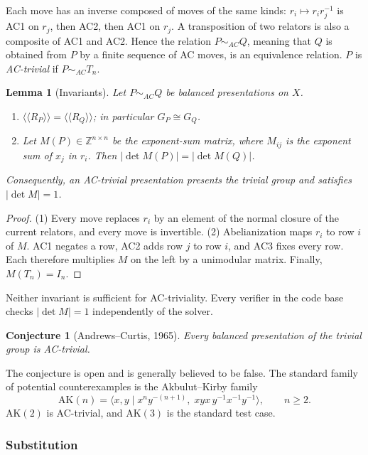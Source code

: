 \documentclass[11pt]{article}
\newtheorem{lemma}[theorem]{Lemma}
\newtheorem{conjecture}[theorem]{Conjecture}
\theoremstyle{definition}
\theoremstyle{remark}
\newcommand{\nc}[1]{\langle\!\langle #1 \rangle\!\rangle}
\newcommand{\pres}[2]{\langle #1 \mid #2 \rangle}
\begin{document}
Each move has an inverse composed of moves of the same kinds: $r_i\mapsto r_ir_j^{-1}$ is AC1 on $r_j$, then AC2,
then AC1 on $r_j$. A transposition of two relators is also a composite of AC1 and AC2. Hence the relation
$P\sim_{AC}Q$, meaning that $Q$ is obtained from $P$ by a finite sequence of AC moves, is an equivalence relation.
$P$ is \emph{AC-trivial} if $P\sim_{AC}T_n$.

\begin{lemma}[Invariants]\label{lem:inv}
Let $P\sim_{AC}Q$ be balanced presentations on $X$.
\begin{enumerate}
  \item $\nc{R_P}=\nc{R_Q}$; in particular $G_P\cong G_Q$.
  \item Let $M(P)\in\mathbb{Z}^{n\times n}$ be the exponent-sum matrix, where $M_{ij}$ is the exponent sum of $x_j$ in
  $r_i$. Then $|\det M(P)|=|\det M(Q)|$.
\end{enumerate}
Consequently, an AC-trivial presentation presents the trivial group and satisfies $|\det M|=1$.
\end{lemma}

\begin{proof}
(1) Every move replaces $r_i$ by an element of the normal closure of the current relators, and every move is
invertible. (2) Abelianization maps $r_i$ to row $i$ of $M$. AC1 negates a row, AC2 adds row $j$ to row $i$, and AC3
fixes every row. Each therefore multiplies $M$ on the left by a unimodular matrix. Finally, $M(T_n)=I_n$.
\end{proof}

Neither invariant is sufficient for AC-triviality. Every verifier in the code base checks $|\det M|=1$ independently of
the solver.

\begin{conjecture}[Andrews--Curtis, 1965]
Every balanced presentation of the trivial group is AC-trivial.
\end{conjecture}

The conjecture is open and is generally believed to be false. The standard family of potential counterexamples is
the Akbulut--Kirby family
\[
\mathrm{AK}(n)=\pres{x,y}{x^{n}y^{-(n+1)},\;xyx\,y^{-1}x^{-1}y^{-1}},\qquad n\ge2.
\]
$\mathrm{AK}(2)$ is AC-trivial, and $\mathrm{AK}(3)$ is the standard test case.

\subsubsection{Substitution}
\end{document}
